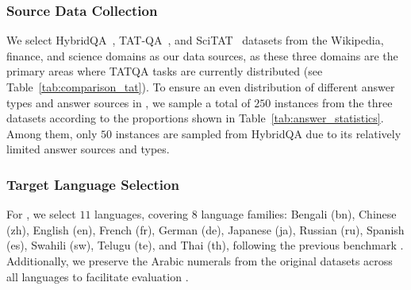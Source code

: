 \subsubsection{Source Data Collection}
We select HybridQA~\cite{chen-etal-2020-hybridqa}, TAT-QA~\cite{zhu-etal-2021-tat}, and SciTAT~\cite{zhang2024scitat} datasets from the Wikipedia, finance, and science domains as our data sources, as these three domains are the primary areas where TATQA tasks are currently distributed (see Table~\ref{tab:comparison_tat}). 
To ensure an even distribution of different answer types and answer sources in \ourdataset, we sample a total of $250$ instances from the three datasets according to the proportions shown in Table~\ref{tab:answer_statistics}. 
Among them, only $50$ instances are sampled from HybridQA due to its relatively limited answer sources and types. 

\subsubsection{Target Language Selection}
For \ourdataset, we select $11$ languages, covering $8$ language families: Bengali (bn), Chinese (zh), English (en), French (fr), German (de), Japanese (ja), Russian (ru), Spanish (es), Swahili (sw), Telugu (te), and Thai (th), following the previous benchmark \cite{shi2023MGSM}. 
Additionally, we preserve the Arabic numerals from the original datasets across all languages to facilitate evaluation \cite{shi2023MGSM}.

